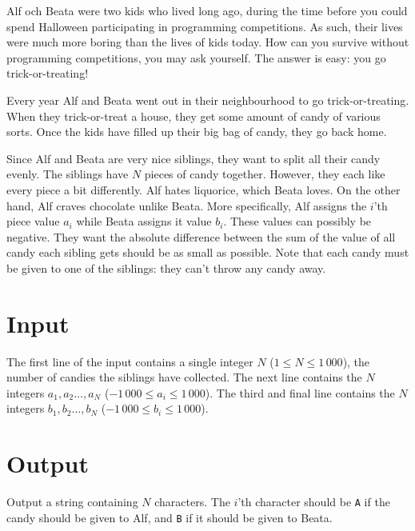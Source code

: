 
\noindent
Alf och Beata were two kids who lived long ago, during the time before you could spend Halloween participating in programming competitions.
As such, their lives were much more boring than the lives of kids today.
How can you survive without programming competitions, you may ask yourself.
The answer is easy: you go trick-or-treating!

Every year Alf and Beata went out in their neighbourhood to go trick-or-treating.
When they trick-or-treat a house, they get some amount of candy of various sorts.
Once the kids have filled up their big bag of candy, they go back home.

Since Alf and Beata are very nice siblings, they want to split all their candy evenly.
The siblings have $N$ pieces of candy together.
However, they each like every piece a bit differently.
Alf hates liquorice, which Beata loves.
On the other hand, Alf craves chocolate unlike Beata.
More specifically, Alf assigns the $i$'th piece value $a_i$ while Beata assigns it value $b_i$.
These values can possibly be negative.
They want the absolute difference between the sum of the value of all candy each sibling gets should be as small as possible.
Note that each candy must be given to one of the siblings: they can't throw any candy away.

\section*{Input}
The first line of the input contains a single integer $N$ ($1 \le N \le 1\,000$), the number of candies the siblings have collected.
The next line contains the $N$ integers $a_1, a_2 \dots, a_N$ ($-1\,000 \le a_i \le 1\,000$).
The third and final line contains the $N$ integers $b_1, b_2 \dots, b_N$ ($-1\,000 \le b_i \le 1\,000$).

\section*{Output}
Output a string containing $N$ characters.
The $i$'th character should be \texttt{A} if the candy should be given to Alf, and \texttt{B} if it should be given to Beata.
